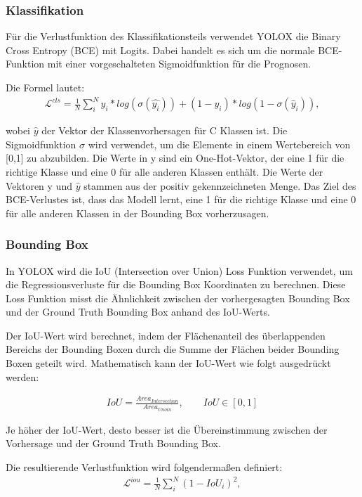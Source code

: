 \subsubsection{Klassifikation}\label{chap:yoloxClassification}
Für die Verlustfunktion des Klassifikationsteils verwendet YOLOX die Binary Cross Entropy (BCE) mit Logits. Dabei handelt es sich um die normale BCE-Funktion mit einer vorgeschalteten Sigmoidfunktion für die Prognosen.

Die Formel lautet:
\begin{align}
	\mathcal{L}^{cls}=\frac{1}{N}\sum_{i}^{N}y_i*log(\sigma(\hat{y_i}))+(1-y_i)*log(1-\sigma(\hat{y}_i)),
\end{align}

wobei $\hat{y}$ der Vektor der Klassenvorhersagen für C Klassen ist. Die Sigmoidfunktion $\sigma$ wird verwendet, um die Elemente in einem Wertebereich von [0,1] zu abzubilden. Die Werte in y sind ein One-Hot-Vektor, der eine 1 für die richtige Klasse und eine 0 für alle anderen Klassen enthält. Die Werte der Vektoren y und $\hat{y}$ stammen aus der positiv gekennzeichneten Menge. Das Ziel des BCE-Verlustes ist, dass das Modell lernt, eine 1 für die richtige Klasse und eine 0 für alle anderen Klassen in der Bounding Box vorherzusagen. \cite{yoloxExplanationHowWorks}

\subsubsection{Bounding Box}
In YOLOX wird die IoU (Intersection over Union) Loss Funktion verwendet, um die Regressionsverluste für die Bounding Box Koordinaten zu berechnen. Diese Loss Funktion misst die Ähnlichkeit zwischen der vorhergesagten Bounding Box und der Ground Truth Bounding Box anhand des IoU-Werts.

Der IoU-Wert wird berechnet, indem der Flächenanteil des überlappenden Bereichs der Bounding Boxen durch die Summe der Flächen beider Bounding Boxen geteilt wird. Mathematisch kann der IoU-Wert wie folgt ausgedrückt werden:

\begin{align}
	IoU = \frac{Area_{Intersection}}{Area_{Unoin}}, \qquad IoU \in [0,1]
\end{align}

Je höher der IoU-Wert, desto besser ist die Übereinstimmung zwischen der Vorhersage und der Ground Truth Bounding Box.

Die resultierende Verlustfunktion wird folgendermaßen definiert:
\begin{align}
	\mathcal{L}^{iou} = \frac{1}{N}\sum_{i}^{N}(1-IoU_i)^2,
\end{align}

